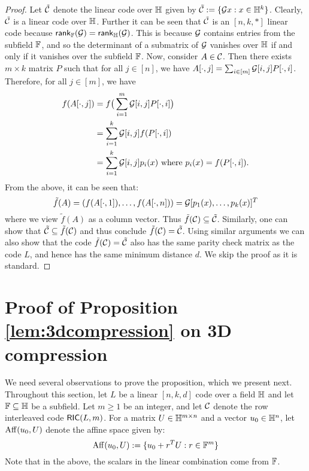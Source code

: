 \begin{proof}
Let $\tilde{\mathcal{C}}$ denote the linear code over $\mathbb{H}$ given by $\tilde{\mathcal{C}} :=
\{\mathcal{G}x: x\in \mathbb{H}^k\}$. Clearly, $\tilde{\mathcal{C}}$ is a linear code over $\mathbb{H}$.
Further it can be seen that $\tilde{\mathcal{C}}$ is an $[n,k,\ast]$ linear code because
$\mathsf{rank}_{\mathbb{F}}(\mathcal{G})=\mathsf{rank}_{\mathbb{H}}(\mathcal{G})$. This is because $\mathcal{G}$
contains entries from the subfield $\mathbb{F}$, and so the determinant of a submatrix of $\mathcal{G}$
vanishes over $\mathbb{H}$ if and only if it vanishes over the subfield $\mathbb{F}$. Now,
consider $A\in \mathcal{C}$. Then there exists $m\times k$ matrix $P$ such that for all $j\in [n]$, 
we have $A[\cdot,j]=\sum_{i\in [m]}\mathcal{G}[i,j]P[\cdot,i]$. Therefore, for all
$j\in [m]$,  we have
\begin{align*}
f(A[\cdot,j]) &= f\big(\sum_{i=1}^m \mathcal{G}[i,j]P[\cdot,i]\big) \\
	&= \sum_{i=1}^k \mathcal{G}[i,j]f(P[\cdot,i]) \\
	&= \sum_{i=1}^k \mathcal{G}[i,j]p_i(x) \text{ where } p_i(x)=f(P[\cdot,i]).
\end{align*}
From the above, it can be seen that:
\[ \tilde{f}(A)=(f(A[\cdot,1]),\ldots,f(A[\cdot,n]))=\mathcal{G}
[p_1(x),\ldots,p_k(x)]^T \]
 where we view $\tilde{f}(A)$ as a column vector. Thus
$\tilde{f}(\mathcal{C})\subseteq \tilde{\mathcal{C}}$. Similarly, one can show that
$\tilde{\mathcal{C}}\subseteq \tilde{f}(\mathcal{C})$ and thus conclude
$\tilde{f}(\mathcal{C})=\tilde{\mathcal{C}}$. Using similar arguments we can also show
that the code $\tilde{f}(\mathcal{C})=\tilde{\mathcal{C}}$ also has the same parity check
matrix as the code $L$, and hence has the same minimum distance $d$. We skip the
proof as it is standard. 
\end{proof}


\section{Proof of Proposition \ref{lem:3dcompression} on 3D compression} \label{app:ProofofLem3dcompression}
We need several observations to prove the proposition, which we present next.
Throughout this section, let $L$ be a linear $[n,k,d]$ code over a field $\mathbb{H}$ and let $\mathbb{F}\subseteq \mathbb{H}$ be a subfield.  Let $m\geq 1$ be an integer, and let $\mathcal{C}$ denote the row interleaved code $\mathsf{RIC}(L,m)$. For a matrix $U\in \mathbb{H}^{m\times n}$ and a vector $u_0\in \mathbb{H}^n$, let ${\rm Aff}({u_0},{U})$ denote the affine space given by:
\begin{equation}\label{eq:affspace}
{\rm Aff}({u_0},{U}) := \{u_0+r^TU: r\in \mathbb{F}^m\}
\end{equation}
Note that in the above, the scalars in the linear combination come from $\mathbb{F}$.

